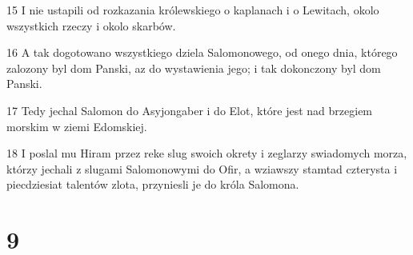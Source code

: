 \par 15 I nie ustapili od rozkazania królewskiego o kaplanach i o Lewitach, okolo wszystkich rzeczy i okolo skarbów.
\par 16 A tak dogotowano wszystkiego dziela Salomonowego, od onego dnia, którego zalozony byl dom Panski, az do wystawienia jego; i tak dokonczony byl dom Panski.
\par 17 Tedy jechal Salomon do Asyjongaber i do Elot, które jest nad brzegiem morskim w ziemi Edomskiej.
\par 18 I poslal mu Hiram przez reke slug swoich okrety i zeglarzy swiadomych morza, którzy jechali z slugami Salomonowymi do Ofir, a wziawszy stamtad czterysta i piecdziesiat talentów zlota, przyniesli je do króla Salomona.

\chapter{9}

